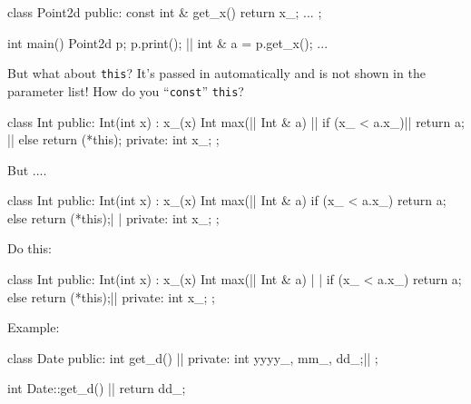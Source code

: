 \begin{consolethree}[escapeinside=||]
class Point2d
{
public:
    const int & get_x()
    {
        return x_;
    }
    ...
};

int main()
{
    Point2d p;
    p.print();
    || int & a = p.get_x();
    ...
}
\end{consolethree}


\newpage{}

But what about \texttt{this}? It's passed in automatically and is not shown in the parameter list! How do you ``\texttt{const}'' \texttt{this}?

\begin{consolethree}[escapeinside=||]
class Int
{
public:
    Int(int x)
        : x_(x)
    {}
    Int max(|| Int & a)    ||
    {
        if (x_ < a.x_)||
            return a;                    ||
        else
            return (*this);
    }
private:
    int x_;
};
\end{consolethree}

But ....

\begin{consolethree}[escapeinside=||]
class Int
{
public:
    Int(int x)
        : x_(x)
    {}
    Int max(|| Int & a)
    {
        if (x_ < a.x_)
            return a;
        else
            return (*this);| |
    }
private:
    int x_;
};
\end{consolethree}

Do this:

\begin{consolethree}[escapeinside=||]
class Int
{
public:
    Int(int x)
        : x_(x)
    {}
    Int max(|| Int & a) | |
    {
        if (x_ < a.x_)
            return a;
        else
            return (*this);||
    }
private:
    int x_;
};
\end{consolethree}
Example:

\begin{consolethree}[escapeinside=||]
class Date
{
public:
    int get_d() ||
private:
    int yyyy_, mm_, dd_;||
};

int Date::get_d() ||
{
    return dd_;
}
\end{consolethree}

